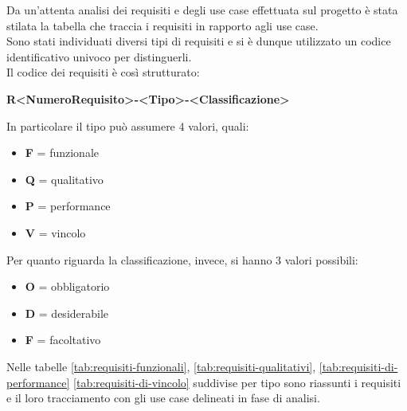 \noindent Da un'attenta analisi dei requisiti e degli use case effettuata sul progetto è stata stilata la tabella che traccia i requisiti in rapporto agli use case.\\
Sono stati individuati diversi tipi di requisiti e si è dunque utilizzato un codice identificativo univoco per distinguerli.\\
Il codice dei requisiti è così strutturato:
\begin{center}
    \textbf{R<NumeroRequisito>-<Tipo>-<Classificazione>}
\end{center}
In particolare il tipo può assumere 4 valori, quali:
\begin{itemize}
    \item \textbf{F} = funzionale
    \item \textbf{Q} = qualitativo
    \item \textbf{P} = performance
    \item \textbf{V} = vincolo
\end{itemize}
Per quanto riguarda la classificazione, invece, si hanno 3 valori possibili:
\begin{itemize}
    \item \textbf{O} = obbligatorio
    \item \textbf{D} = desiderabile
    \item \textbf{F} = facoltativo
\end{itemize}
Nelle tabelle \ref{tab:requisiti-funzionali}, \ref{tab:requisiti-qualitativi}, \ref{tab:requisiti-di-performance} \ref{tab:requisiti-di-vincolo} suddivise per tipo sono riassunti i requisiti e il loro tracciamento con gli use case delineati in fase di analisi.

\renewcommand{\arraystretch}{1.6}


